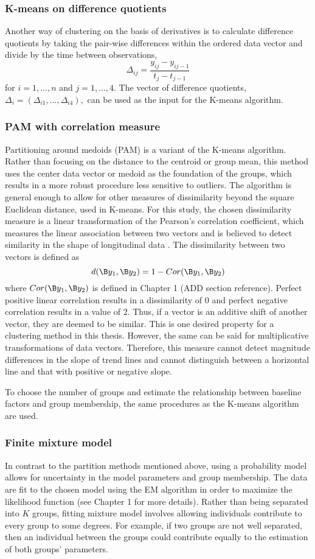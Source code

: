 \subsubsection{K-means on difference quotients}
Another way of clustering on the basis of derivatives is to calculate difference quotients by taking the pair-wise differences within the ordered data vector and divide by the time between observations,
$$\Delta_{ij} = \frac{y_{ij}-y_{ij-1}}{t_{j}-t_{j-1}}$$
for $i=1,...,n$ and $j=1,...,4$. The vector of difference quotients, $\Delta_{i}=(\Delta_{i1},...,\Delta_{i4}),$ can be used as the input for the K-means algorithm.

\subsubsection{PAM with correlation measure}
Partitioning around medoids (PAM) is a variant of the K-means algorithm. Rather than focusing on the distance to the centroid or group mean, this method uses the center data vector or medoid as the foundation of the groups, which results in a more robust procedure less sensitive to outliers. The algorithm is general enough to allow for other measures of dissimilarity beyond the square Euclidean distance, used in K-means. For this study, the chosen dissimilarity measure is a linear transformation of the Pearson's correlation coefficient, which measures the linear association between two vectors and is believed to detect similarity in the shape of longitudinal data \cite{chouakria2007,  eisen1998,chiou2008}. The dissimilarity between two vectors is defined as
$$d(\B y_{1},\B y_{2}) = 1-Cor(\B y_{1},\B y_{2})$$
where $Cor(\B y_{1},\B y_{2})$ is defined in Chapter 1 (ADD section reference). Perfect positive linear correlation results in a dissimilarity of 0 and perfect negative correlation results in a value of 2. Thus, if a vector is an additive shift of another vector, they are deemed to be similar. This is one desired property for a clustering method in this thesis. However, the same can be said for multiplicative transformations of data vectors. Therefore, this measure cannot detect magnitude differences in the slope of trend lines and cannot distinguish between a horizontal line and that with positive or negative slope.

To choose the number of groups and estimate the relationship between baseline factors and group membership, the same procedures as the K-means algorithm are used.

\subsubsection{Finite mixture model}
In contrast to the partition methods mentioned above, using a probability model allows for uncertainty in the model parameters and group membership. The data are fit to the chosen model using the EM algorithm in order to maximize the likelihood function (see Chapter 1 for more details). Rather than being separated into $K$ groups, fitting mixture model involves allowing individuals contribute to every group to some degrees. For example, if two groups are not well separated, then an individual between the groups could contribute equally to the estimation of both groups' parameters. 

